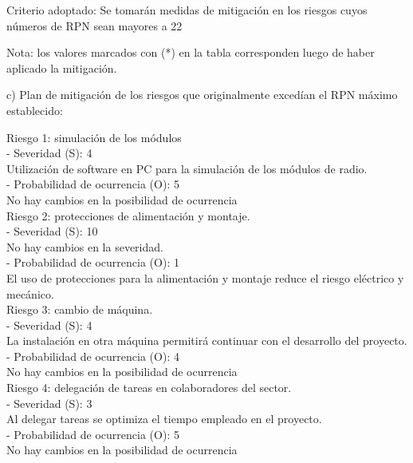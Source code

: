 \documentclass[
11pt%
]{charter}
\begin{document}
Criterio adoptado: 
Se tomarán medidas de mitigación en los riesgos cuyos números de RPN sean mayores a 22

Nota: los valores marcados con (*) en la tabla corresponden luego de haber aplicado la mitigación.

c) Plan de mitigación de los riesgos que originalmente excedían el RPN máximo establecido:
 
Riesgo 1: simulación de los módulos\\
    \hfill \break
  - Severidad (S): 4\\
    \hspace{0.25cm}Utilización de software en PC para la simulación de los módulos de radio.\\
	\hfill \break
  - Probabilidad de ocurrencia (O): 5\\
  	\hspace{0.25cm}No hay cambios en la posibilidad de ocurrencia\\
        \hfill \break
Riesgo 2: protecciones de alimentación y montaje.\\
    \hfill \break
  - Severidad (S): 10\\
    \hspace{0.25cm}No hay cambios en la severidad.\\
	\hfill \break
  - Probabilidad de ocurrencia (O): 1\\
  	\hspace{0.25cm}El uso de protecciones para la alimentación y montaje reduce el riesgo eléctrico y mecánico.\\ 
    \hfill \break  	
Riesgo 3: cambio de máquina.\\
    \hfill \break
  - Severidad (S): 4\\
    \hspace{0.25cm}La instalación en otra máquina permitirá continuar con el desarrollo del proyecto.\\ 
    \hfill \break
  - Probabilidad de ocurrencia (O): 4\\
  	\hspace{0.25cm}No hay cambios en la posibilidad de ocurrencia\\ 
    \hfill \break  	
Riesgo 4: delegación de tareas en colaboradores del sector.\\
    \hfill \break
  - Severidad (S): 3\\
    \hspace{0.25cm}Al delegar tareas se optimiza el tiempo empleado en el proyecto.\\ 
    \hfill \break
  - Probabilidad de ocurrencia (O): 5\\
  	\hspace{0.25cm}No hay cambios en la posibilidad de ocurrencia\\ 
\end{document}
